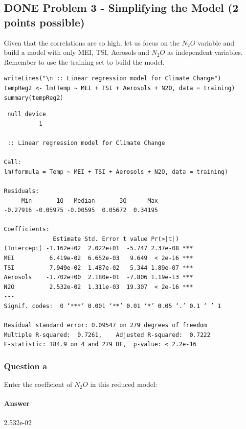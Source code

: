\documentclass[letterpaper, 9pt, onecolumn, twoside, technote, final]{IEEEtran}
\begin{document}
\subsection{{\bfseries\sffamily DONE} Problem 3 - Simplifying the Model (2 points possible)}
\label{sec-1-5}
Given that the correlations are so high, let us focus on the $N_2O$
variable and build a model with only MEI, TSI, Aerosols and $N_2O$ as
independent variables. Remember to use the training set to build the
model.

\begin{verbatim}
writeLines("\n :: Linear regression model for Climate Change")
tempReg2 <- lm(Temp ~ MEI + TSI + Aerosols + N2O, data = training)
summary(tempReg2)
\end{verbatim}

\begin{verbatim}
 null device
          1

 :: Linear regression model for Climate Change

Call:
lm(formula = Temp ~ MEI + TSI + Aerosols + N2O, data = training)

Residuals:
     Min       1Q   Median       3Q      Max
-0.27916 -0.05975 -0.00595  0.05672  0.34195

Coefficients:
              Estimate Std. Error t value Pr(>|t|)
(Intercept) -1.162e+02  2.022e+01  -5.747 2.37e-08 ***
MEI          6.419e-02  6.652e-03   9.649  < 2e-16 ***
TSI          7.949e-02  1.487e-02   5.344 1.89e-07 ***
Aerosols    -1.702e+00  2.180e-01  -7.806 1.19e-13 ***
N2O          2.532e-02  1.311e-03  19.307  < 2e-16 ***
---
Signif. codes:  0 ‘***’ 0.001 ‘**’ 0.01 ‘*’ 0.05 ‘.’ 0.1 ‘ ’ 1

Residual standard error: 0.09547 on 279 degrees of freedom
Multiple R-squared:  0.7261,	Adjusted R-squared:  0.7222
F-statistic: 184.9 on 4 and 279 DF,  p-value: < 2.2e-16
\end{verbatim}

\subsubsection{Question a}
\label{sec-1-5-1}

Enter the coefficient of $N_2O$ in this reduced model:

\paragraph{Answer}
\label{sec-1-5-1-1}

2.532e-02
\end{document}
